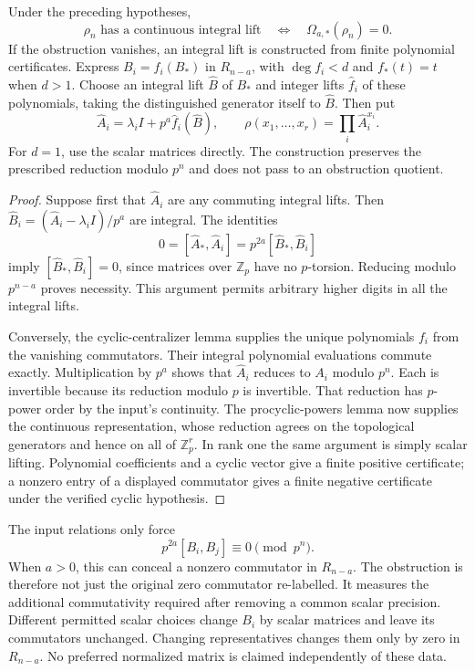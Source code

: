 \begin{theorem}\label{thm:normalized-cyclic-lift}
Under the preceding hypotheses,
\[
 \boxed{\rho_n\text{ has a continuous integral lift}
 \quad\Longleftrightarrow\quad\Omega_{a,*}(\rho_n)=0.}
\]
If the obstruction vanishes, an integral lift is constructed from finite polynomial certificates. Express $B_i=f_i(B_*)$ in $R_{n-a}$, with $\deg f_i<d$ and $f_*(t)=t$ when $d>1$. Choose an integral lift $\widehat B$ of $B_*$ and integer lifts $\widehat f_i$ of these polynomials, taking the distinguished generator itself to $\widehat B$. Then put
\[
 \widehat A_i=\lambda_i I+p^a\widehat f_i(\widehat B),
 \qquad
 \rho(x_1,\ldots,x_r)=\prod_i\widehat A_i^{x_i}.
\]
For $d=1$, use the scalar matrices directly. The construction preserves the prescribed reduction modulo $p^n$ and does not pass to an obstruction quotient.
\end{theorem}
\begin{proof}
Suppose first that $\widehat A_i$ are any commuting integral lifts. Then
$\widehat B_i=(\widehat A_i-\lambda_iI)/p^a$ are integral. The identities
\[
 0=[\widehat A_*,\widehat A_i]
   =p^{2a}[\widehat B_*,\widehat B_i]
\]
imply $[\widehat B_*,\widehat B_i]=0$, since matrices over $\mathbb Z_p$ have no $p$-torsion. Reducing modulo $p^{n-a}$ proves necessity. This argument permits arbitrary higher digits in all the integral lifts.

Conversely, the cyclic-centralizer lemma supplies the unique polynomials $f_i$ from the vanishing commutators. Their integral polynomial evaluations commute exactly. Multiplication by $p^a$ shows that $\widehat A_i$ reduces to $A_i$ modulo $p^n$. Each is invertible because its reduction modulo $p$ is invertible. That reduction has $p$-power order by the input's continuity. The procyclic-powers lemma now supplies the continuous representation, whose reduction agrees on the topological generators and hence on all of $\mathbb Z_p^r$. In rank one the same argument is simply scalar lifting. Polynomial coefficients and a cyclic vector give a finite positive certificate; a nonzero entry of a displayed commutator gives a finite negative certificate under the verified cyclic hypothesis.
\end{proof}

\begin{remark}
The input relations only force
\[
 p^{2a}[B_i,B_j]\equiv0\pmod{p^n}.
\]
When $a>0$, this can conceal a nonzero commutator in $R_{n-a}$. The obstruction is therefore not just the original zero commutator re-labelled. It measures the additional commutativity required after removing a common scalar precision. Different permitted scalar choices change $B_i$ by scalar matrices and leave its commutators unchanged. Changing representatives changes them only by zero in $R_{n-a}$. No preferred normalized matrix is claimed independently of these data.
\end{remark}

